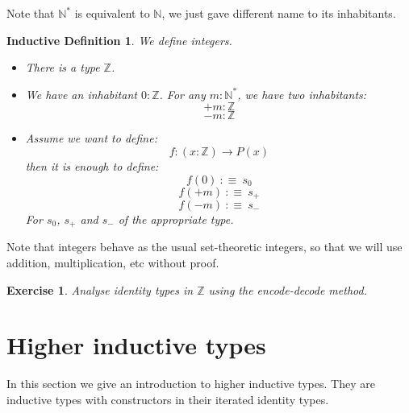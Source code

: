 \documentclass{article}
\newcommand{\se}[1]{\medbreak \medbreak \section{#1}}
\newcommand{\sse}[1]{\medbreak \subsection{#1}}
\renewcommand{\r}{\rightarrow}
\newtheorem{ind_def}{Inductive Definition}
\newtheorem{exercise}{Exercise}
\begin{document}
Note that $\mathbb{N}^*$ is equivalent to $\mathbb{N}$, we just gave different name to its inhabitants.

\begin{ind_def}
We define integers.
\begin{itemize}
\item There is a type $\mathbb{Z}$.
\item We have an inhabitant $0:\mathbb{Z}$.
For any $m:\mathbb{N}^*$, we have two inhabitants:
\[+m : \mathbb{Z}\]
\[-m:\mathbb{Z}\]
\item Assume we want to define:
\[f:(x:\mathbb{Z})\r P(x)\]
then it is enough to define:
\[f(0) \ :\equiv\ s_0\]
\[f(+m) \ :\equiv\ s_+\]
\[f(-m) \ :\equiv\ s_-\]
For $s_0$, $s_+$ and $s_-$ of the appropriate type.
\end{itemize}
\end{ind_def}

Note that integers behave as the usual set-theoretic integers, so that we will use addition, multiplication, etc without proof.

\begin{exercise}
Analyse identity types in $\mathbb{Z}$ using the encode-decode method. 
\end{exercise}




\se{Higher inductive types}

In this section we give an introduction to higher inductive types. They are inductive types with constructors in their iterated identity types.



\end{document}

